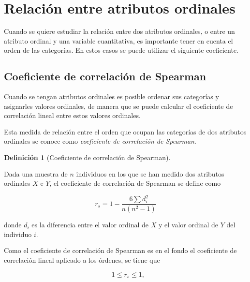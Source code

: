 \documentclass[
  spanish,
  a4paper,
]{scrreport}
\theoremstyle{plain}
\theoremstyle{definition}
\theoremstyle{definition}
\newtheorem{definition}{Definición}[chapter]
\theoremstyle{remark}
\begin{document}
\section{Relación entre atributos
ordinales}\label{relaciuxf3n-entre-atributos-ordinales}

Cuando se quiere estudiar la relación entre dos atributos ordinales, o
entre un atributo ordinal y una variable cuantitativa, es importante
tener en cuenta el orden de las categorías. En estos casos se puede
utilizar el siguiente coeficiente.

\subsection{Coeficiente de correlación de
Spearman}\label{coeficiente-de-correlaciuxf3n-de-spearman}

Cuando se tengan atributos ordinales es posible ordenar sus categorías y
asignarles valores ordinales, de manera que se puede calcular el
coeficiente de correlación lineal entre estos valores ordinales.

Esta medida de relación entre el orden que ocupan las categorías de dos
atributos ordinales se conoce como \emph{coeficiente de correlación de
Spearman}.

\begin{definition}[Coeficiente de correlación de
Spearman]\protect\hypertarget{def-coeficiente-correlacion-spearman}{}\label{def-coeficiente-correlacion-spearman}

Dada una muestra de \(n\) individuos en los que se han medido dos
atributos ordinales \(X\) e \(Y\), el coeficiente de correlación de
Spearman se define como

\[r_s = 1-\frac{6\sum d_i^2}{n(n^2-1)}\]

donde \(d_i\) es la diferencia entre el valor ordinal de \(X\) y el
valor ordinal de \(Y\) del individuo \(i\).

\end{definition}

\begin{tcolorbox}[enhanced jigsaw, arc=.35mm, bottomrule=.15mm, bottomtitle=1mm, breakable, colback=white, colbacktitle=quarto-callout-important-color!10!white, colframe=quarto-callout-important-color-frame, coltitle=black, left=2mm, leftrule=.75mm, opacityback=0, opacitybacktitle=0.6, rightrule=.15mm, title=\textcolor{quarto-callout-important-color}{\faExclamation}\hspace{0.5em}{Importante}, titlerule=0mm, toprule=.15mm, toptitle=1mm]

Como el coeficiente de correlación de Spearman es en el fondo el
coeficiente de correlación lineal aplicado a los órdenes, se tiene que

\[-1\leq r_s\leq 1,\]

\end{tcolorbox}
\end{document}
